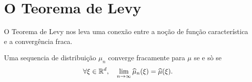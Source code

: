 % 
% 





\section{O Teorema de Levy}

O Teorema de Levy nos leva uma conexão entre a noção de função característica e a convergência fraca.


\begin{theorem}
 Uma sequencia de distribuição $\mu_n$ converge fracamente para $\mu$ se e sò se 
 \begin{equation}
  \forall \xi \in {\ensuremath{\mathbb R}}^d, \quad \lim_{n\to \infty}\widehat \mu_n(\xi)=\widehat \mu(\xi).
 \end{equation}
\end{theorem}


